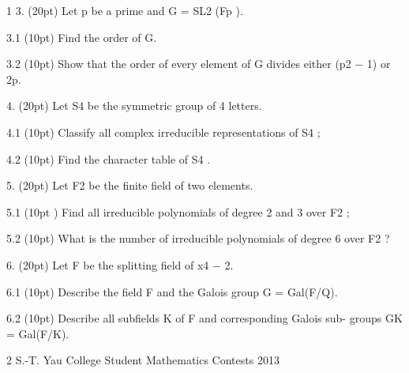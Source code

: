 \documentclass[UTF8,12pt]{ctexart}
\begin{document}
1 3. (20pt) Let p be a prime and G = SL2 (Fp ).

3.1 (10pt) Find the order of G.

3.2 (10pt) Show that the order of every element of G divides either (p2 − 1) or 2p.

4. (20pt) Let S4 be the symmetric group of 4 letters.

4.1 (10pt) Classify all complex irreducible representations of S4 ;

4.2 (10pt) Find the character table of S4 .

5. (20pt) Let F2 be the finite field of two elements.

5.1 (10pt ) Find all irreducible polynomials of degree 2 and 3 over F2 ;

5.2 (10pt) What is the number of irreducible polynomials of degree 6 over F2 ?

6. (20pt) Let F be the splitting field of x4 − 2.

6.1 (10pt) Describe the field F and the Galois group G = Gal(F/Q).

6.2 (10pt) Describe all subfields K of F and corresponding Galois sub- groups GK = Gal(F/K).

2 S.-T. Yau College Student Mathematics Contests 2013
\end{document}
